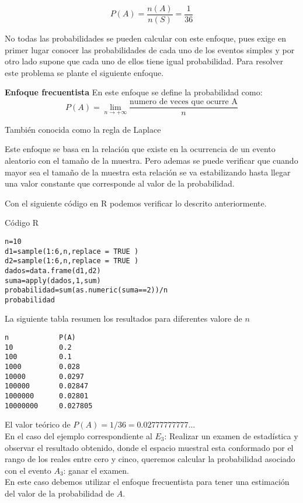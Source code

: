 \documentclass[base=hide,12pt]{elegantbook}
\begin{document}
$$P(A) = \dfrac{n(A)}{n(S)} = \dfrac{1}{36} $$

No todas las probabilidades se pueden calcular con este enfoque, pues exige en primer lugar conocer las probabilidades de cada uno de los eventos simples y por otro lado supone que cada uno de ellos tiene  igual probabilidad. Para resolver este problema se plante el siguiente enfoque.

\vspace{.5cm}
\begin{Box4}{\large \bf Enfoque frecuentista}
	En este enfoque se define la probabilidad como:
	$$P(A)=\displaystyle\lim_{n \to{+}\infty} \dfrac{\text{numero de veces que ocurre A}}{n} $$
	
	También conocida como  la regla de  Laplace	
\end{Box4}

Este enfoque se basa en la relación que existe en la ocurrencia de un evento aleatorio con el tamaño de la muestra. Pero ademas se puede verificar que cuando mayor sea el tamaño de la muestra esta relación se va estabilizando hasta llegar una valor constante que corresponde al valor de la probabilidad.

Con  el siguiente código en  R podemos verificar lo descrito anteriormente.

\begin{Box3}{Código R}
\begin{verbatim}
n=10
d1=sample(1:6,n,replace = TRUE )
d2=sample(1:6,n,replace = TRUE )
dados=data.frame(d1,d2)
suma=apply(dados,1,sum)
probabilidad=sum(as.numeric(suma==2))/n
probabilidad
\end{verbatim}
\end{Box3}

La siguiente tabla resumen los resultados para diferentes valore de $n$

\begin{verbatim}
n            P(A)
10           0.2
100          0.1
1000         0.028
10000        0.0297
100000       0.02847
1000000      0.02801
10000000     0.027805
\end{verbatim}

El valor teórico de  $P(A)= 1/36 = 0.02777777777...$\\

En el caso del ejemplo correspondiente al $E_3$:  Realizar un examen de estadística y observar el resultado obtenido, donde el espacio muestral esta conformado por el rango de  los reales entre cero y cinco, queremos calcular la probabilidad asociado con el evento $A_3$:  ganar el  examen. \\
En este caso debemos utilizar el enfoque frecuentista para tener una estimación del valor de la probabilidad de $A$.\\
\end{document}
